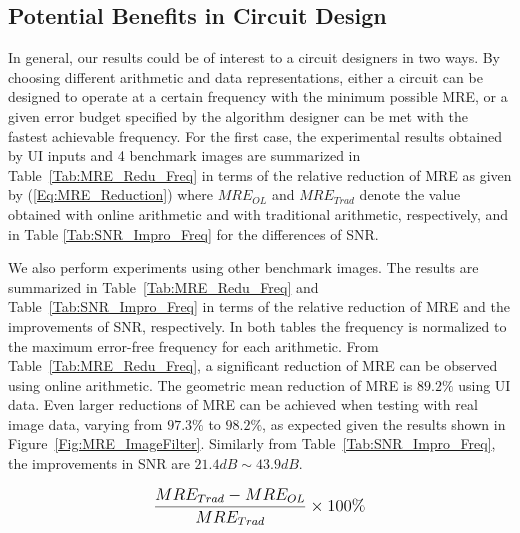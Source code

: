 \documentclass[journal]{IEEEtran}
\begin{document}
\subsection{Potential Benefits in Circuit Design}
In general, our results could be of interest to a circuit designers in two ways. By choosing different arithmetic and data representations, either a circuit can be designed to operate at a certain frequency with the minimum possible MRE, or a given error budget specified by the algorithm designer can be met with the fastest achievable frequency. For the first case, the experimental results obtained by UI inputs and 4 benchmark images are summarized in Table~\ref{Tab:MRE_Redu_Freq} in terms of the relative reduction of MRE as given by (\ref{Eq:MRE_Reduction}) where $MRE_{OL}$ and $MRE_{Trad}$ denote the value obtained with online arithmetic and with traditional arithmetic, respectively, and in Table \ref{Tab:SNR_Impro_Freq} for the differences of SNR.

We also perform experiments using other benchmark images. The results are summarized in Table~\ref{Tab:MRE_Redu_Freq} and Table~\ref{Tab:SNR_Impro_Freq} in terms of the relative reduction of MRE and the improvements of SNR, respectively. In both tables the frequency is normalized to the maximum error-free frequency for each arithmetic. From Table~\ref{Tab:MRE_Redu_Freq}, a significant reduction of MRE can be observed using online arithmetic. The geometric mean reduction of MRE is $89.2\%$ using UI data. Even larger reductions of MRE can be achieved when testing with real image data, varying from $97.3\%$ to $98.2\%$, as expected given the results shown in Figure~\ref{Fig:MRE_ImageFilter}. Similarly from Table~\ref{Tab:SNR_Impro_Freq}, the improvements in SNR are $21.4dB\sim43.9dB$.

\begin{eqnarray}\label{Eq:MRE_Reduction}
\scriptsize
  \frac{MRE_{Trad}-MRE_{OL}}{MRE_{Trad}}\times100\%
\normalsize
\end{eqnarray}
\end{document}
